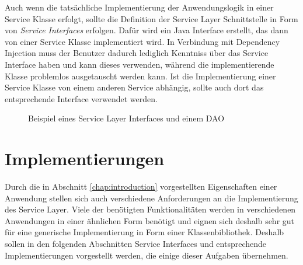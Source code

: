 Auch wenn die tatsächliche Implementierung der Anwendungslogik in einer Service
Klasse erfolgt, sollte die Definition der Service Layer Schnittstelle in Form von
\emph{Service Interfaces} erfolgen. Dafür wird ein Java Interface erstellt, das
dann von einer Service Klasse implementiert wird. In Verbindung mit Dependency
Injection muss der Benutzer dadurch lediglich Kenntniss über das Service
Interface haben und kann dieses verwenden, während die implementierende Klasse
problemlos ausgetauscht werden kann. Ist die Implementierung einer Service Klasse
von einem anderen Service abhängig, sollte auch dort das entsprechende Interface
verwendet werden.

\begin{figure}[bth]
	\caption{Beispiel eines Service Layer Interfaces und einem \ac{DAO}}
\end{figure}

\section{Implementierungen}
Durch die in Abschnitt \ref{chap:introduction} vorgestellten Eigenschaften einer
Anwendung stellen sich auch verschiedene Anforderungen an die Implementierung des
Service Layer. Viele der benötigten Funktionalitäten werden in verschiedenen
Anwendungen in einer ähnlichen Form benötigt und eignen sich deshalb sehr gut für
eine generische Implementierung in Form einer Klassenbibliothek. Deshalb sollen
in den folgenden Abschnitten Service Interfaces und entsprechende Implementierungen
vorgestellt werden, die einige dieser Aufgaben übernehmen.

